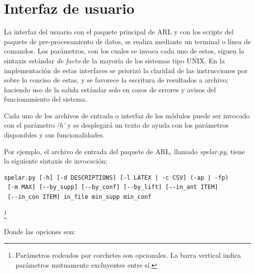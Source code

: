 \section{Interfaz de usuario}

La interfaz del usuario con el paquete principal de ARL y con los scripts del paquete de pre-procesamiento de datos, se realiza mediante un terminal o línea de comandos. Los parámetros, con los cuales se invoca cada uno de estos, siguen la sintaxis estándar \textit{de facto} de la mayoría de los sistemas tipo UNIX. En la implementación de estas interfaces se priorizó la claridad de las instrucciones por sobre lo conciso de estas, y se favorece la escritura de resultados a archivo; haciendo uso de la salida estándar solo en casos de errores y avisos del funcionamiento del sistema.

Cada uno de los archivos de entrada o interfaz de los módulos puede ser invocado con el parámetro \textit{\'-h\'} y se desplegará un texto de ayuda con los parámetros disponibles y sus funcionalidades.

Por ejemplo, el archivo de entrada del paquete de ARL, llamado \textit{spelar.py}, tiene la siguiente sintaxis de invocación:

\begin{lstlisting}[basicstyle=\ttfamily]
spelar.py [-h] [-d DESCRIPTIONS] [-l LATEX | -c CSV] (-ap | -fp)
 [-m MAX] [--by_supp] [--by_conf] [--by_lift] [--in_ant ITEM] 
 [--in_con ITEM] in_file min_supp min_conf
\end{lstlisting}\footnote{Parámetros rodeados por corchetes son opcionales. La barra vertical indica parámetros mutuamente excluyentes entre sí.}

Donde las opciones son:

